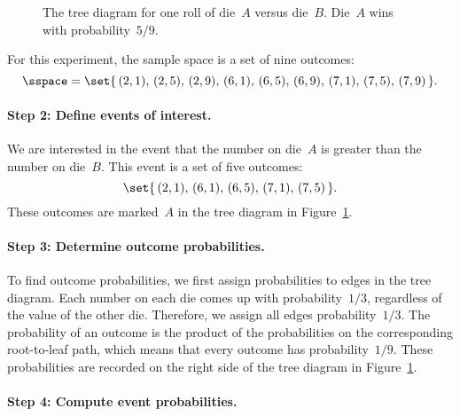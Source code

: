 \begin{figure}


\caption{The tree diagram for one roll of die~$A$ versus die~$B$.
  Die~$A$ wins with probability~$5/9$.}

\label{fig:14A8}

\end{figure}

For this experiment, the sample space is a set of nine outcomes:
\begin{equation*}
\sspace = \set{\, (2, 1), \, (2, 5), \, (2, 9), \,
                  (6, 1), \, (6, 5), \, (6, 9), \,
                  (7, 1), \, (7, 5), \, (7, 9) \,}.
\end{equation*}

\paragraph{Step 2: Define events of interest.}

We are interested in the event that the number on die~$A$ is greater
than the number on die~$B$.  This event is a set of five outcomes:
\begin{equation*}
    \set{\, (2, 1), \, (6, 1), \, (6, 5), \, (7, 1), \, (7, 5) \,}.
\end{equation*}
These outcomes are marked~$A$ in the tree diagram in
Figure~\ref{fig:14A8}.

\paragraph{Step 3: Determine outcome probabilities.}

To find outcome probabilities, we first assign probabilities to edges
in the tree diagram.  Each number on each die comes up with
probability~$1/3$, regardless of the value of the other die.
Therefore, we assign all edges probability~$1/3$.  The probability of
an outcome is the product of the probabilities on the corresponding
root-to-leaf path, which means that every outcome has
probability~$1/9$.  These probabilities are recorded on the right side
of the tree diagram in Figure~\ref{fig:14A8}.

\paragraph{Step 4: Compute event probabilities.}

